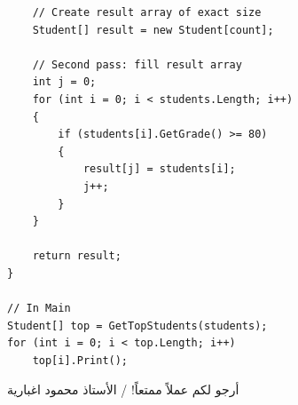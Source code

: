\documentclass[14pt]{extarticle}
\begin{document}
\begin{enumerate}
\begin{english}
\begin{verbatim}
    // Create result array of exact size
    Student[] result = new Student[count];

    // Second pass: fill result array
    int j = 0;
    for (int i = 0; i < students.Length; i++)
    {
        if (students[i].GetGrade() >= 80)
        {
            result[j] = students[i];
            j++;
        }
    }

    return result;
}

// In Main
Student[] top = GetTopStudents(students);
for (int i = 0; i < top.Length; i++)
    top[i].Print();
\end{verbatim}
\end{english}
\clearpage
\fi

\end{enumerate}

\vspace{1em}
\begin{flushleft}
أرجو لكم عملاً ممتعاً! / الأستاذ محمود اغبارية
\end{flushleft}
\end{document}
